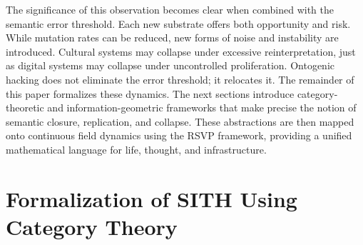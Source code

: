 \documentclass[11pt,oneside]{article}
\begin{document}
The significance of this observation becomes clear when combined with the semantic error threshold. Each new substrate offers both opportunity and risk. While mutation rates can be reduced, new forms of noise and instability are introduced. Cultural systems may collapse under excessive reinterpretation, just as digital systems may collapse under uncontrolled proliferation. Ontogenic hacking does not eliminate the error threshold; it relocates it.
The remainder of this paper formalizes these dynamics. The next sections introduce category-theoretic and information-geometric frameworks that make precise the notion of semantic closure, replication, and collapse. These abstractions are then mapped onto continuous field dynamics using the RSVP framework, providing a unified mathematical language for life, thought, and infrastructure.

\section{Formalization of SITH Using Category Theory}
\end{document}
